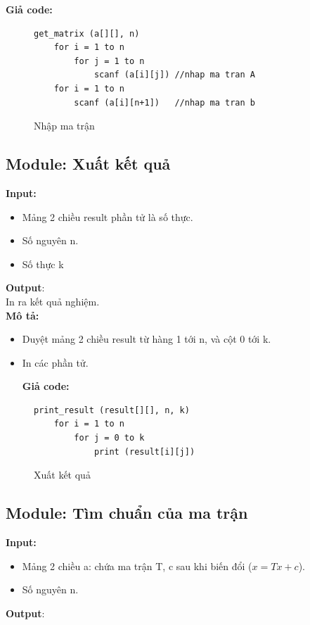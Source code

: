 \documentclass[twoside]{report2}
\begin{document}
\textbf{Giả code:}
\begin{figure}[h]
\begin{lstlisting}[frame=single]
get_matrix (a[][], n)
    for i = 1 to n
        for j = 1 to n
            scanf (a[i][j])	//nhap ma tran A
    for i = 1 to n
        scanf (a[i][n+1])	//nhap ma tran b
\end{lstlisting}
\caption{Nhập ma trận}
\end{figure}

\newpage
\subsection{Module: Xuất kết quả}
\textbf{Input:}
\begin{itemize}
\item Mảng 2 chiều result phần tử là số thực.
\item Số nguyên n.
\item Số thực k
\end{itemize}
\textbf{Output}:\\

\quad In ra kết quả nghiệm.\\

\textbf{Mô tả:}
\begin{itemize}
\item Duyệt mảng 2 chiều result từ hàng 1 tới n, và cột 0 tới k.
\item In các phần tử.

\textbf{Giả code:}
\end{itemize}

\begin{figure}[h]
\begin{lstlisting}[frame=single]
print_result (result[][], n, k)
    for i = 1 to n
        for j = 0 to k
            print (result[i][j])
\end{lstlisting}
\caption{Xuất kết quả}
\end{figure}

\newpage

\newpage
\subsection{Module: Tìm chuẩn của ma trận}
\textbf{Input:}
\begin{itemize}
\item Mảng 2 chiều a: chứa ma trận T, c sau khi biến đổi ($x = Tx + c$).
\item Số nguyên n.
\end{itemize}
\textbf{Output}:\\
\end{document}
